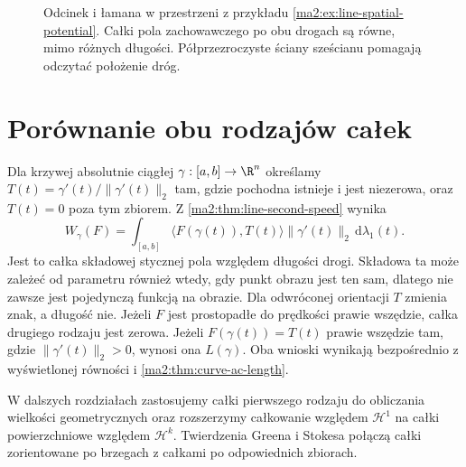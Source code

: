 \begin{figure}[htbp]
\centering
{}
\caption{Odcinek i łamana w przestrzeni z przykładu
\ref{ma2:ex:line-spatial-potential}.
Całki pola zachowawczego po obu drogach są równe,
mimo różnych długości. Półprzezroczyste ściany
sześcianu pomagają odczytać położenie dróg.}
\label{ma2:fig:line-spatial-potential}
\end{figure}

\section{Porównanie obu rodzajów całek}

Dla krzywej absolutnie ciągłej
$\gamma:[a,b]\to\R^n$ określamy
$T(t)=\gamma'(t)/\|\gamma'(t)\|_2$ tam,
gdzie pochodna istnieje i jest niezerowa,
oraz $T(t)=0$ poza tym zbiorem.
Z \ref{ma2:thm:line-second-speed} wynika
\[
 W_\gamma(F)=\int_{[a,b]}
 \langle F(\gamma(t)),T(t)\rangle
 \|\gamma'(t)\|_2\,\mathrm d\lambda_1(t).
\]
Jest to całka składowej stycznej pola
względem długości drogi. Składowa ta
może zależeć od parametru również wtedy,
gdy punkt obrazu jest ten sam, dlatego
nie zawsze jest pojedynczą funkcją na obrazie.
Dla odwróconej orientacji $T$ zmienia znak,
a długość nie. Jeżeli $F$ jest prostopadłe
do prędkości prawie wszędzie, całka
drugiego rodzaju jest zerowa. Jeżeli
$F(\gamma(t))=T(t)$ prawie wszędzie tam,
gdzie $\|\gamma'(t)\|_2>0$, wynosi ona
$L(\gamma)$. Oba wnioski wynikają
bezpośrednio z wyświetlonej równości
i \ref{ma2:thm:curve-ac-length}.

W dalszych rozdziałach zastosujemy całki
pierwszego rodzaju do obliczania wielkości
geometrycznych oraz rozszerzymy całkowanie
względem $\mathcal H^1$ na całki powierzchniowe
względem $\mathcal H^k$.
Twierdzenia Greena i Stokesa połączą
całki zorientowane po brzegach z całkami
po odpowiednich zbiorach.
